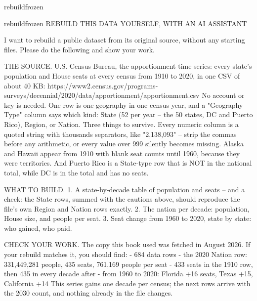 \documentclass[
]{article}
\makeatletter
\newcommand{\dd@aitonefrozen}{frozen}
\newenvironment{ddaiprompt}[2]
  {\par\vspace{0.9em}%
   \def\dd@aitone{#1}%
   \ifx\dd@aitone\dd@aitonefrozen
     \def\FrameCommand{\textcolor{ddgap}{\vrule width 5pt}\hspace{11pt}}%
   \else
     \def\FrameCommand{\textcolor{cmured}{\vrule width 5pt}\hspace{11pt}}%
   \fi
   \MakeFramed{\advance\hsize-\width\FrameRestore}%
   {\ddMono\fontsize{8}{10}\selectfont
    \ifx\dd@aitone\dd@aitonefrozen\color{ddgap}\else\color{cmured}\fi
    \MakeUppercase{#2}\par}\vspace{0.5em}%
   \ddMono\fontsize{9}{12.5}\selectfont\color{ddink}\raggedright\sloppy\obeylines}
  {\endMakeFramed\par\vspace{0.9em}}
\makeatother
\begin{document}
\begin{ddaiprompt}{rebuild}{Rebuild this data yourself, with an AI assistant}
I want to rebuild a public dataset from its original source, without any
starting files. Please do the following and show your work.

THE SOURCE. U.S. Census Bureau, the apportionment time series: every
state's population and House seats at every census from 1910 to
2020, in one CSV of about 40 KB:
https://www2.census.gov/programs-surveys/decennial/2020/data/apportionment/apportionment.csv
No account or key is needed. One row is one geography in one census
year, and a "Geography Type" column says which kind: State (52 per
year -- the 50 states, DC and Puerto Rico), Region, or Nation. Three
things to survive. Every numeric column is a quoted string with
thousands separators, like "2,138,093" -- strip the commas before
any arithmetic, or every value over 999 silently becomes missing.
Alaska and Hawaii appear from 1910 with blank seat counts until
1960, because they were territories. And Puerto Rico is a State-type
row that is NOT in the national total, while DC is in the total and
has no seats.

WHAT TO BUILD.
1. A state-by-decade table of population and seats -- and a check:
   the State rows, summed with the cautions above, should reproduce
   the file's own Region and Nation rows exactly.
2. The nation per decade: population, House size, and people per
   seat.
3. Seat change from 1960 to 2020, state by state: who gained, who
   paid.

CHECK YOUR WORK. The copy this book used was fetched in August 2026.
If your rebuild matches it, you should find:
- 684 data rows
- the 2020 Nation row: 331,449,281 people, 435 seats, 761,169 people
  per seat
- 433 seats in the 1910 row, then 435 in every decade after
- from 1960 to 2020: Florida +16 seats, Texas +15, California +14
This series gains one decade per census; the next rows arrive with
the 2030 count, and nothing already in the file changes.
\end{ddaiprompt}
\end{document}
